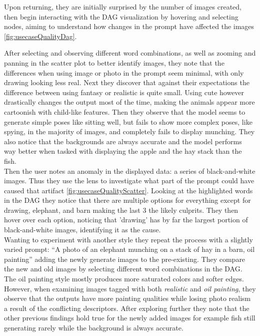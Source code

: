 \documentclass[
  a4paper,  %
  twoside,  %
  bibliography=totoc,
  headsepline,
  cleardoublepage=empty,
  parskip=half,
  draft=false
]{scrbook}
\begin{document}
Upon returning, they are initially surprised by the number of images created, then begin interacting with the DAG visualization by hovering and selecting nodes, aiming to understand how changes in the prompt have affected the images \cref{fig:usecaseQualityDag}. 

After selecting and observing different word combinations, as well as zooming and panning in the scatter plot to better identify images, they note that the differences when using image or photo in the prompt seem minimal, with only drawing looking less real. Next they discover that against their expectations the difference between using fantasy or realistic is quite small. Using cute however drastically changes the output most of the time, making the animals appear more cartoonish with child-like features. Then they observe that the model seems to generate simple poses like sitting well, but fails to show more complex poses, like spying, in the majority of images, and completely fails to display munching. They also notice that the backgrounds are always accurate and the model performs way better when tasked with displaying the apple and the hay stack than the fish. \\
Then the user notes an anomaly in the displayed data: a series of black-and-white images. Thus they use the lens to investigate what part of the prompt could have caused that artifact \cref{fig:usecaseQualityScatter}. Looking at the highlighted words in the DAG they notice that there are multiple options for everything except for drawing, elephant, and barn making the last 3 the likely culprits. They then hover over each option, noticing that 'drawing' has by far the largest portion of black-and-white images, identifying it as the cause.\\
Wanting to experiment with another style they repeat the process with a slightly varied prompt: \enquote{A photo of an elephant munching on a stack of hay in a barn, oil painting} adding the newly generate images to the pre-existing. They compare the new and old images by selecting different word combinations in the DAG. The oil painting style mostly produces more saturated colors and softer edges. However, when examining images tagged with both \emph{realistic} and \emph{oil painting}, they observe that the outputs have more painting qualities while losing photo realism a result of the conflicting descriptors. After exploring further they note that the other previous findings hold true for the newly added images for example fish still generating rarely while the background is always accurate.
\end{document}
